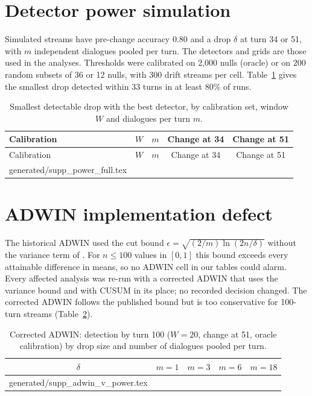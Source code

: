 \documentclass[10pt]{article}
\makeatletter
\newcommand{\inputtable}[1]{\@@input #1 }
\makeatother
\begin{document}
\section{Detector power simulation}
Simulated streams have pre-change accuracy 0.80 and a drop $\delta$ at turn 34
or 51, with $m$ independent dialogues pooled per turn. The detectors and grids
are those used in the analyses. Thresholds were calibrated on 2,000 nulls
(oracle) or on 200 random subsets of 36 or 12 nulls, with 300 drift streams per
cell. Table~\ref{tab:powerfull} gives the smallest drop detected within 33
turns in at least 80\% of runs.

\begin{longtable}{lcccc}
\caption{Smallest detectable drop with the best detector, by calibration set,
window $W$ and dialogues per turn $m$.}\label{tab:powerfull}\\
\toprule Calibration & $W$ & $m$ & Change at 34 & Change at 51\\\midrule\endfirsthead
\toprule Calibration & $W$ & $m$ & Change at 34 & Change at 51\\\midrule\endhead
\inputtable{generated/supp_power_full.tex}
\bottomrule
\end{longtable}

\section{ADWIN implementation defect}
\label{sec:adwin}
The historical ADWIN used the cut bound $\epsilon=\sqrt{(2/m)\ln(2n/\delta)}$
without the variance term of \citet{bifet2007learning}. For $n\le100$ values in
$[0,1]$ this bound exceeds every attainable difference in means, so no ADWIN
cell in our tables could alarm. Every affected analysis was re-run with a
corrected ADWIN that uses the variance bound and with CUSUM in its place; no
recorded decision changed. The corrected ADWIN follows the published bound but
is too conservative for 100-turn streams (Table~\ref{tab:adwv}).

\begin{table}[h]\centering\small
\caption{Corrected ADWIN: detection by turn 100 ($W=20$, change at 51, oracle
calibration) by drop size and number of dialogues pooled per turn.}
\label{tab:adwv}
\begin{tabular}{ccccc}\toprule
$\delta$ & $m=1$ & $m=3$ & $m=6$ & $m=18$\\\midrule
\inputtable{generated/supp_adwin_v_power.tex}
\bottomrule\end{tabular}\end{table}
\end{document}
